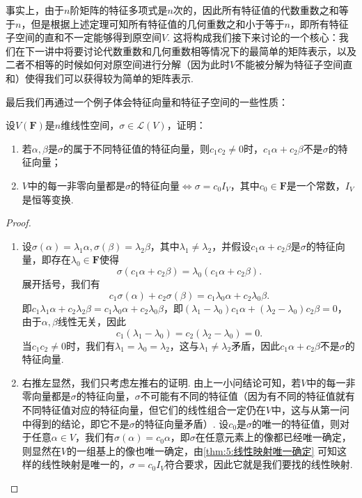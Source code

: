 事实上，由于$n$阶矩阵的特征多项式是$n$次的，因此所有特征值的代数重数之和等于$n$，但是根据上述定理可知所有特征值的几何重数之和小于等于$n$，即所有特征子空间的直和不一定能够得到原空间$V$. 这将构成我们接下来讨论的一个核心：我们在下一讲中将要讨论代数重数和几何重数相等情况下的最简单的矩阵表示，以及二者不相等的时候如何对原空间进行分解（因为此时$V$不能被分解为特征子空间直和）使得我们可以获得较为简单的矩阵表示.

最后我们再通过一个例子体会特征向量和特征子空间的一些性质：
\begin{example}
    设$V(\mathbf{F})$是$n$维线性空间，$\sigma\in \mathcal{L}(V)$，证明：
    \begin{enumerate}
        \item 若$\alpha,\beta$是$\sigma$的属于不同特征值的特征向量，则$c_1c_2\neq 0$时，$c_1\alpha+c_2\beta$不是$\sigma$的特征向量；

        \item $V$中的每一非零向量都是$\sigma$的特征向量$\iff\sigma=c_0I_V$，其中$c_0\in\mathbf{F}$是一个常数，$I_V$是恒等变换.
    \end{enumerate}
\end{example}

\begin{proof}
    \begin{enumerate}
        \item 设$\sigma(\alpha)=\lambda_1\alpha,\sigma(\beta)=\lambda_2\beta$，其中$\lambda_1\neq\lambda_2$，并假设$c_1\alpha+c_2\beta$是$\sigma$的特征向量，即存在$\lambda_0\in\mathbf{F}$使得
              \[\sigma(c_1\alpha+c_2\beta)=\lambda_0(c_1\alpha+c_2\beta).\]
              展开括号，我们有
              \[c_1\sigma(\alpha)+c_2\sigma(\beta)=c_1\lambda_0\alpha+c_2\lambda_0\beta.\]
              即$c_1\lambda_1\alpha+c_2\lambda_2\beta=c_1\lambda_0\alpha+c_2\lambda_0\beta$，即$(\lambda_1-\lambda_0)c_1\alpha+(\lambda_2-\lambda_0)c_2\beta=0$，由于$\alpha,\beta$线性无关，因此
              \[c_1(\lambda_1-\lambda_0)=c_2(\lambda_2-\lambda_0)=0.\]
              当$c_1c_2\neq 0$时，我们有$\lambda_1=\lambda_0=\lambda_2$，这与$\lambda_1\neq\lambda_2$矛盾，因此$c_1\alpha+c_2\beta$不是$\sigma$的特征向量.

        \item 右推左显然，我们只考虑左推右的证明. 由上一小问结论可知，若$V$中的每一非零向量都是$\sigma$的特征向量，$\sigma$不可能有不同的特征值（因为有不同的特征值就有不同特征值对应的特征向量，但它们的线性组合一定仍在$V$中，这与从第一问中得到的结论，即它不是$\sigma$的特征向量矛盾）. 设$c_0$是$\sigma$的唯一的特征值，则对于任意$\alpha\in V$，我们有$\sigma(\alpha)=c_0\alpha$，即$\sigma$在任意元素上的像都已经唯一确定，则显然在$V$的一组基上的像也唯一确定，由\autoref{thm:5:线性映射唯一确定} 可知这样的线性映射是唯一的，$\sigma=c_0I_V$符合要求，因此它就是我们要找的线性映射.
    \end{enumerate}
\end{proof}

